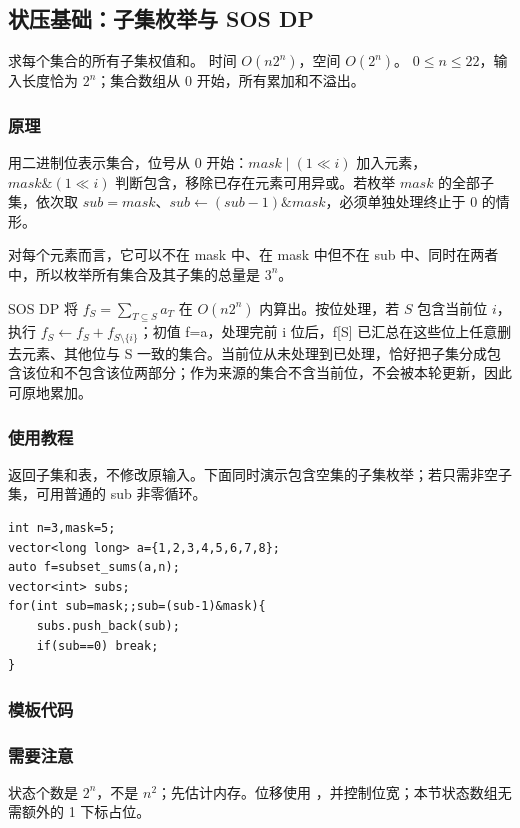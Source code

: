 \subsection{状压基础：子集枚举与 SOS DP}
\label{dp:subset-dp}
\AlgorithmInfo
    {求每个集合的所有子集权值和。}
    {时间 $O(n2^n)$，空间 $O(2^n)$。}
    {$0\le n\le22$，输入长度恰为 $2^n$；集合数组从 0 开始，所有累加和不溢出。}
\subsubsection*{原理}

用二进制位表示集合，位号从 0 开始：$mask\mathbin{|}(1\ll i)$ 加入元素，$mask\mathbin{\&}(1\ll i)$ 判断包含，移除已存在元素可用异或。若枚举 $mask$ 的全部子集，依次取 $sub=mask$、$sub\gets(sub-1)\mathbin{\&}mask$，必须单独处理终止于 0 的情形。

对每个元素而言，它可以不在 mask 中、在 mask 中但不在 sub 中、同时在两者中，所以枚举所有集合及其子集的总量是 $3^n$。

SOS DP 将 $f_S=\sum_{T\subseteq S}a_T$ 在 $O(n2^n)$ 内算出。按位处理，若 $S$ 包含当前位 $i$，执行 $f_S\gets f_S+f_{S\setminus\{i\}}$；初值 f=a，处理完前 i 位后，f[S] 已汇总在这些位上任意删去元素、其他位与 S 一致的集合。当前位从未处理到已处理，恰好把子集分成包含该位和不包含该位两部分；作为来源的集合不含当前位，不会被本轮更新，因此可原地累加。

\subsubsection*{使用教程}
 返回子集和表，不修改原输入。下面同时演示包含空集的子集枚举；若只需非空子集，可用普通的 sub 非零循环。
\begin{lstlisting}[style=mtycpp,numbers=none]
int n=3,mask=5;
vector<long long> a={1,2,3,4,5,6,7,8};
auto f=subset_sums(a,n);
vector<int> subs;
for(int sub=mask;;sub=(sub-1)&mask){
	subs.push_back(sub);
	if(sub==0) break;
}
\end{lstlisting}
\subsubsection*{模板代码}
\subsubsection*{需要注意}
状态个数是 $2^n$，不是 $n^2$；先估计内存。位移使用 ，并控制位宽；本节状态数组无需额外的 1 下标占位。
